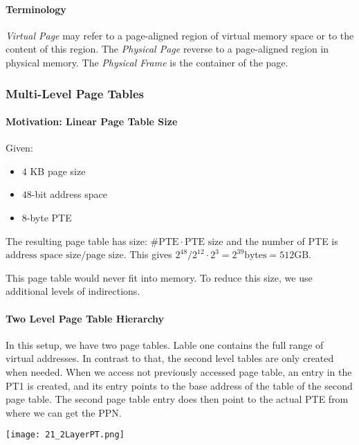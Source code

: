 

\paragraph{Terminology}
\textit{Virtual Page} may refer to a page-aligned region of virtual memory space or to the content of this region. The \textit{Physical Page} reverse to a page-aligned region in physical memory. The \textit{Physical Frame} is the container of the page.

\subsubsection{Multi-Level Page Tables}

\paragraph{Motivation: Linear Page Table Size}
Given:
\begin{itemize}
    \item $4$ KB page size
    \item $48$-bit address space
    \item $8$-byte PTE
\end{itemize}

The resulting page table has size: $\#\text{PTE} \cdot \text{PTE size}$ and the number of PTE is $\text{address space size} / \text{page size}$. This gives $2^{48} / 2^{12} \cdot 2^3 = 2^{39} \text{bytes} = 512 \text{GB}$.

This page table would never fit into memory. To reduce this size, we use additional levels of indirections.

\paragraph{Two Level Page Table Hierarchy}
In this setup, we have two page tables. Lable one contains the full range of virtual addresses. In contrast to that, the second level tables are only created when needed. When we access not previously accessed page table, an entry in the PT1 is created, and its entry points to the base address of the table of the second page table. The second page table entry does then point to the actual PTE from where we can get the PPN.

\texttt{[image: 21\_2LayerPT.png]}

